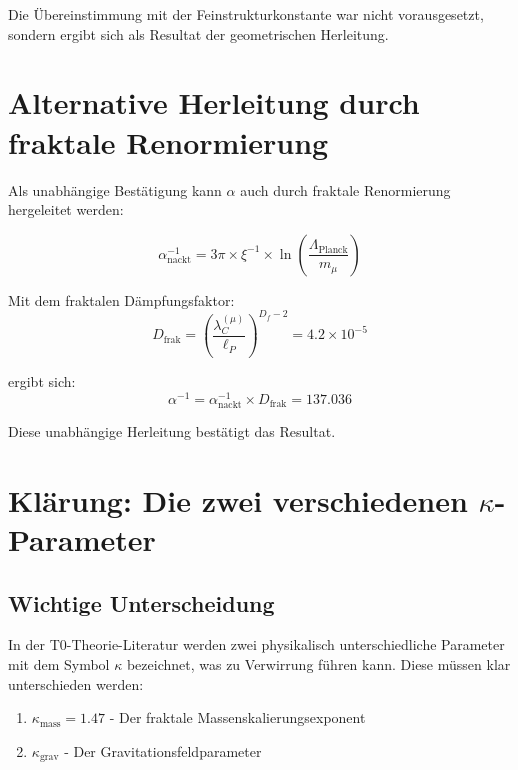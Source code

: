 \documentclass[12pt,a4paper]{article}
\theoremstyle{definition}
\begin{document}
	Die \"Ubereinstimmung mit der Feinstrukturkonstante war nicht vorausgesetzt, sondern ergibt sich als Resultat der geometrischen Herleitung.
	
	\section{Alternative Herleitung durch fraktale Renormierung}
	
	Als unabh\"angige Best\"atigung kann $\alpha$ auch durch fraktale Renormierung hergeleitet werden:
	
	\begin{equation}
		\alpha_{\text{nackt}}^{-1} = 3\pi \times \xi^{-1} \times \ln\left(\frac{\Lambda_{\text{Planck}}}{m_\mu}\right)
	\end{equation}
	
	Mit dem fraktalen D\"ampfungsfaktor:
	\begin{equation}
		D_{\text{frak}} = \left(\frac{\lambda_C^{(\mu)}}{\ell_P}\right)^{D_f-2} = 4.2 \times 10^{-5}
	\end{equation}
	
	ergibt sich:
	\begin{equation}
		\alpha^{-1} = \alpha_{\text{nackt}}^{-1} \times D_{\text{frak}} = 137.036
	\end{equation}
	
	Diese unabh\"angige Herleitung best\"atigt das Resultat.
	
	\section{Kl\"arung: Die zwei verschiedenen $\kappa$-Parameter}
	
	\subsection{Wichtige Unterscheidung}
	
	In der T0-Theorie-Literatur werden zwei physikalisch unterschiedliche Parameter mit dem Symbol $\kappa$ bezeichnet, was zu Verwirrung f\"uhren kann. Diese m\"ussen klar unterschieden werden:
	
	\begin{enumerate}
		\item $\kappa_{\text{mass}} = 1.47$ - Der fraktale Massenskalierungsexponent
		\item $\kappa_{\text{grav}}$ - Der Gravitationsfeldparameter
	\end{enumerate}
	
\end{document}
